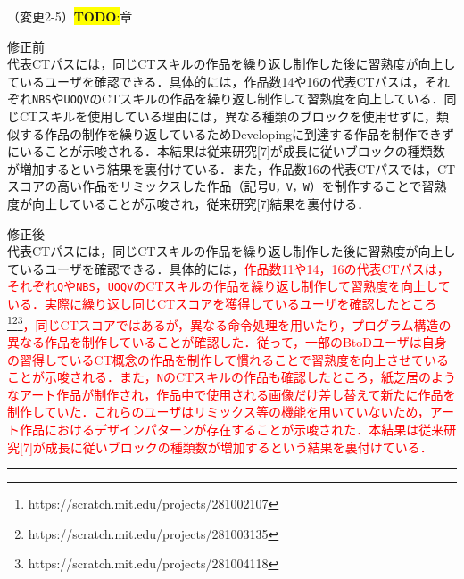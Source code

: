 \documentclass{jarticle} %
\newcommand{\todo}[1]{\colorbox{yellow}{{\bf TODO}:}{\color{blue}{\textbf{[#1]}}}}
\def\subsection#1{ \vspace{1pc} {\gt #1} }
\def\nextans{ \vspace{2pc} \hrule }
\begin{document}
\subsection{（変更2-5）\todo{todo}章}
\vspace{-0.3cm}
\begin{description}
\item 修正前\\
\phantom{　}
代表CTパスには，同じCTスキルの作品を繰り返し制作した後に習熟度が向上しているユーザを確認できる．具体的には，作品数14や16の代表CTパスは，それぞれ\texttt{\large{NBS}}や\texttt{\large{UOQV}}のCTスキルの作品を繰り返し制作して習熟度を向上している．同じCTスキルを使用している理由には，異なる種類のブロックを使用せずに，類似する作品の制作を繰り返しているためDevelopingに到達する作品を制作できずにいることが示唆される．本結果は従来研究[7]が成長に従いブロックの種類数が増加するという結果を裏付けている．また，作品数16の代表CTパスでは，CTスコアの高い作品をリミックスした作品（記号\texttt{\large{U，V，W}}）を制作することで習熟度が向上していることが示唆され，従来研究[7]結果を裏付ける．

\vspace{-0.3cm}
\item 修正後\\
\phantom{　}
代表CTパスには，同じCTスキルの作品を繰り返し制作した後に習熟度が向上しているユーザを確認できる．具体的には，\textcolor{red}{作品数11や14，16の代表CTパスは，それぞれ\texttt{\large{Q}}や\texttt{\large{NBS}}，\texttt{\large{UOQV}}のCTスキルの作品を繰り返し制作して習熟度を向上している．実際に繰り返し同じCTスコアを獲得しているユーザを確認したところ\footnote{https://scratch.mit.edu/projects/281002107}\footnote{https://scratch.mit.edu/projects/281003135}\footnote{https://scratch.mit.edu/projects/281004118}，同じCTスコアではあるが，異なる命令処理を用いたり，プログラム構造の異なる作品を制作していることが確認した．従って，一部のBtoDユーザは自身の習得しているCT概念の作品を制作して慣れることで習熟度を向上させていることが示唆される．また，\texttt{\large{N}}のCTスキルの作品も確認したところ，紙芝居のようなアート作品が制作され，作品中で使用される画像だけ差し替えて新たに作品を制作していた．これらのユーザはリミックス等の機能を用いていないため，アート作品におけるデザインパターンが存在することが示唆された．本結果は従来研究[7]が成長に従いブロックの種類数が増加するという結果を裏付けている．}
\end{description}




\newpage
\nextans
\end{document}
